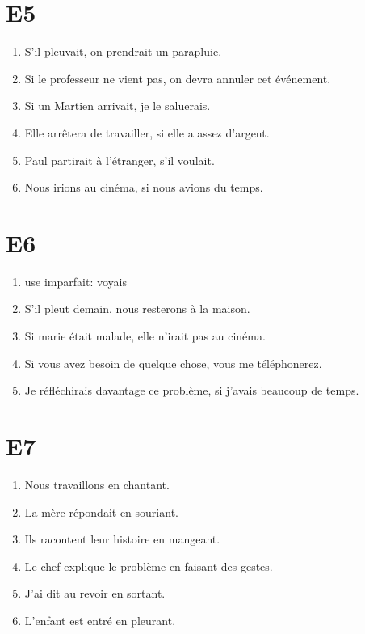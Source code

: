 \documentclass{book}
\begin{document}
    \section{E5}
        \begin{enumerate}
            \item S'il pleuvait, on prendrait un parapluie.
            \item Si le professeur ne vient pas, on devra annuler cet événement.
            \item Si un Martien arrivait, je le saluerais.
            \item Elle arrêtera de travailler, si elle a assez d'argent.
            \item Paul partirait à l'étranger, s'il voulait.
            \item Nous irions au cinéma, si nous avions du temps.
        \end{enumerate}

    \section{E6}
        \begin{enumerate}
            \item use imparfait: voyais
            \item S'il pleut demain, nous resterons à la maison.
            \item Si marie était malade, elle n'irait pas au cinéma.
            \item Si vous avez besoin de quelque chose, vous me téléphonerez.
            \item Je réfléchirais davantage ce problème, si j'avais beaucoup de temps.
        \end{enumerate}

    \section{E7}
        \begin{enumerate}
            \item Nous travaillons en chantant.
            \item La mère répondait en souriant.
            \item Ils racontent leur histoire en mangeant.
            \item Le chef explique le problème en faisant des gestes.
            \item J'ai dit au revoir en sortant.
            \item L'enfant est entré en pleurant.
        \end{enumerate}
\end{document}
